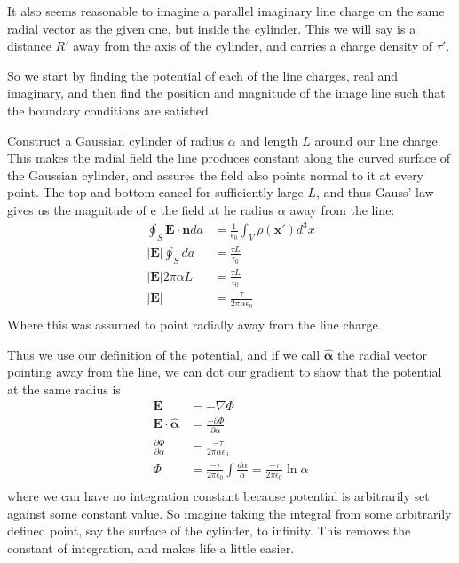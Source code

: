 \documentclass{article}
\begin{document}
It also seems reasonable to imagine a parallel imaginary line charge on the same radial vector as the given one, but inside the cylinder. This we will say is a distance $R'$ away from the axis of the cylinder, and carries a charge density of $\tau'$.

So we start by finding the potential of each of the line charges, real and imaginary, and then find the position and magnitude of the image line such that the boundary conditions are satisfied.

Construct a Gaussian cylinder of radius $\alpha$ and length $L$ around our line charge. This makes the radial field the line produces constant along the curved surface of the Gaussian cylinder, and assures the field also points normal to it at every point. The top and bottom cancel for sufficiently large $L$, and thus Gauss' law gives us the magnitude of e the field at he radius $\alpha$ away from the line:
\begin{align*}
\oint_{S} \mathbf{E}\cdot\mathbf{n} da &= \frac{1}{\epsilon_{0}} \int_{V} \rho(\mathbf{x'}) d^{3}x\\
\left| \mathbf{E} \right| \oint_{S} da &= \frac{\tau L}{\epsilon_{0}}\\
\left| \mathbf{E} \right| 2\pi \alpha L &= \frac{\tau L}{\epsilon_{0}}\\
\left| \mathbf{E} \right| &= \frac{\tau}{2\pi \alpha \epsilon_{0}}\\
\end{align*}
Where this was assumed to point radially away from the line charge.

Thus we use our definition of the potential, and if we call $\mathbf{\hat{\alpha}}$ the radial vector pointing away from the line, we can dot our gradient to show that the potential at the same radius is
\begin{align*}
\mathbf{E}&=-\nabla\Phi\\
\mathbf{E}\cdot\mathbf{\hat{\alpha}}&=\frac{-\partial\Phi}{\partial \alpha}\\
\frac{\partial\Phi}{\partial \alpha} &= \frac{-\tau}{2\pi \alpha \epsilon_{0}}\\
\Phi &= \frac{-\tau}{2\pi\epsilon_{0}} \int \frac{d\alpha}{\alpha} = \frac{-\tau}{2\pi\epsilon_{0}}\ln\alpha\\
\end{align*}
where we can have no integration constant because potential is arbitrarily set against some constant value. So imagine taking the integral from some arbitrarily defined point, say the surface of the cylinder, to infinity. This removes the constant of integration, and makes life a little easier.
\end{document}
